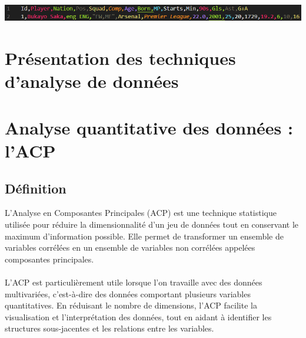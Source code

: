 \documentclass[11pt]{scrartcl}
\begin{document}
            \begin{center}
                \includegraphics[width=1\textwidth]{images/exemple_entree.png}
            \end{center}    



    \section{Présentation des techniques d'analyse de données}



    \section{Analyse quantitative des données : l'ACP}

        \subsection{Définition}
            L'Analyse en Composantes Principales (ACP) est une technique statistique utilisée pour réduire la dimensionnalité d'un jeu de données tout en conservant le maximum d'information possible. Elle permet de transformer un ensemble de variables corrélées en un ensemble de variables non corrélées appelées composantes principales.\\\\
            L'ACP est particulièrement utile lorsque l'on travaille avec des données multivariées, c'est-à-dire des données comportant plusieurs variables quantitatives. En réduisant le nombre de dimensions, l'ACP facilite la visualisation et l'interprétation des données, tout en aidant à identifier les structures sous-jacentes et les relations entre les variables.\\
\end{document}
